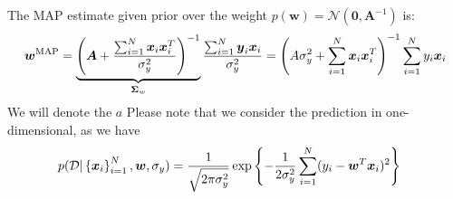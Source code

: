 \begin{proposition}
    The MAP estimate given prior over the weight $p(\boldsymbol w) = \mathcal{N}(\boldsymbol 0, \boldsymbol A^{-1})$ is:
    \begin{equation*}
        \boldsymbol w^\text{MAP} = \underbrace{\left( \boldsymbol A + \frac{\sum_{i=1}^N\boldsymbol x_i\boldsymbol x_i^T}{\sigma_y^2} \right)^{-1}}_{\boldsymbol \Sigma_w}\frac{\sum_{i=1}^N\boldsymbol y_i\boldsymbol x_i}{\sigma^2_y} = \left( A\sigma^2_y + \sum_{i=1}^N\boldsymbol x_i\boldsymbol x_i^T \right)^{-1}\sum^N_{i=1}y_i\boldsymbol x_i
    \end{equation*}
    We will denote the $ a $
    Please note that we consider the prediction in one-dimensional, as we have
    \begin{equation*}
    \begin{aligned}
        &p(\mathcal{D} | \left\{ \boldsymbol x_i \right\}^N_{i=1}, \boldsymbol w, \sigma_y) = \frac{1}{\sqrt{2\pi\sigma^2_y}}\exp\left\{ -\frac{1}{2\sigma_y^2}\sum^N_{i=1} (y_i - \boldsymbol w^T\boldsymbol x_i)^2  \right\}
    \end{aligned}
    \end{equation*}
\end{proposition}
